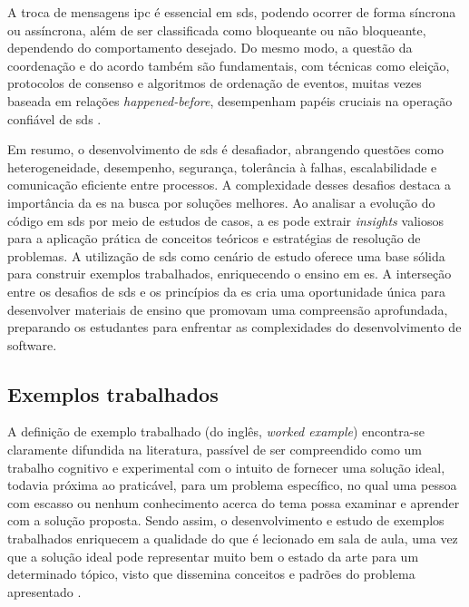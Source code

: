A troca de mensagens \gls{ipc} é essencial em \gls{sds}, podendo ocorrer de forma síncrona ou assíncrona, além de ser classificada como bloqueante ou não bloqueante, dependendo do comportamento desejado. Do mesmo modo, a questão da coordenação e do acordo também são fundamentais, com técnicas como eleição, protocolos de consenso e algoritmos de ordenação de eventos, muitas vezes baseada em relações \textit{happened-before}, desempenham papéis cruciais na operação confiável de \gls{sds} \cite{DistributedSystemsCoulouris}.

Em resumo, o desenvolvimento de \gls{sds} é desafiador, abrangendo questões como heterogeneidade, desempenho, segurança, tolerância à falhas, escalabilidade e comunicação eficiente entre processos. A complexidade desses desafios destaca a importância da \gls{es} na busca por soluções melhores. Ao analisar a evolução do código em \gls{sds} por meio de estudos de casos, a \gls{es} pode extrair \textit{insights} valiosos para a aplicação prática de conceitos teóricos e estratégias de resolução de problemas. A utilização de \gls{sds} como cenário de estudo oferece uma base sólida para construir exemplos trabalhados, enriquecendo o ensino em \gls{es}. A interseção entre os desafios de \gls{sds} e os princípios da \gls{es} cria uma oportunidade única para desenvolver materiais de ensino que promovam uma compreensão aprofundada, preparando os estudantes para enfrentar as complexidades do desenvolvimento de software.

\subsection{Exemplos trabalhados}

A definição de exemplo trabalhado (do inglês, \textit{worked example}) encontra-se claramente difundida na literatura, passível de ser compreendido como um trabalho cognitivo e experimental com o intuito de fornecer uma solução ideal, todavia próxima ao praticável, para um problema específico, no qual uma pessoa com escasso ou nenhum conhecimento acerca do tema possa examinar e aprender com a solução proposta. Sendo assim, o desenvolvimento e estudo de exemplos trabalhados enriquecem a qualidade do que é lecionado em sala de aula, uma vez que a solução ideal pode representar muito bem o estado da arte para um determinado tópico, visto que dissemina conceitos e padrões do problema apresentado \cite{Robert.Atkinson-etal:2000}.

